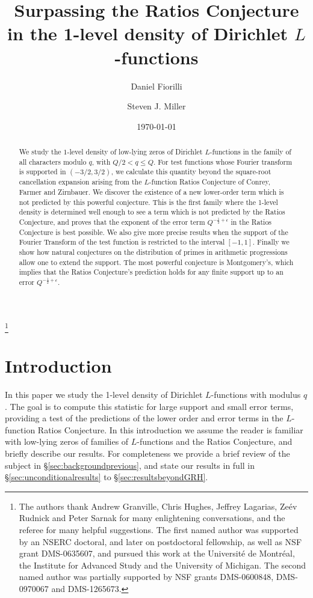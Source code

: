 \documentclass[12pt,reqno]{amsart}
\title{Surpassing the Ratios Conjecture in the 1-level density of Dirichlet $L$-functions}
\author{Daniel Fiorilli}
\author{Steven J. Miller}
\date{\today}
\numberwithin{equation}{section}
\theoremstyle{plain}
\begin{document}
\thanks{The authors thank Andrew Granville, Chris Hughes, Jeffrey Lagarias, Ze\'ev Rudnick and Peter Sarnak for many enlightening conversations, and the referee for many helpful suggestions. The first named author was supported by an NSERC doctoral, and later on postdoctoral fellowship, as well as NSF grant DMS-0635607, and pursued this work at the Universit\'e de Montr\'eal, the Institute for Advanced Study and the University of Michigan. The second named author was partially supported by NSF grants DMS-0600848, DMS-0970067 and DMS-1265673.}

\begin{abstract}
We study the $1$-level density of low-lying zeros of Dirichlet $L$-functions in the family of all characters modulo $q$, with $Q/2 < q\leq Q$. For test functions whose Fourier transform is supported in $(-3/2, 3/2)$, we calculate this quantity beyond the square-root cancellation expansion arising from the $L$-function Ratios Conjecture of Conrey, Farmer and Zirnbauer. We discover the existence of a new lower-order term which is not predicted by this powerful conjecture. This is the first family where the 1-level density is determined well enough to see a term which is not predicted by the Ratios Conjecture, and proves that the exponent of the error term $Q^{-\frac 12 +\epsilon}$ in the Ratios Conjecture is best possible. We also give more precise results when the support of the Fourier Transform of the test function is restricted to the interval $[-1,1]$. Finally we show how natural conjectures on the distribution of primes in arithmetic progressions allow one to extend the support. The most powerful conjecture is Montgomery's, which implies that the Ratios Conjecture's prediction holds for any finite support up to an error $Q^{-\frac 12 +\epsilon}$.

\end{abstract}

\maketitle

\tableofcontents

\section{Introduction}\label{sec:introduction}

In this paper we study the 1-level density of Dirichlet $L$-functions with modulus $q$. The goal is to compute this statistic for large support and small error terms, providing a test of the predictions of the lower order and error terms in the $L$-function Ratios Conjecture. In this introduction we assume the reader is familiar with low-lying zeros of families of $L$-functions and the Ratios Conjecture, and briefly describe our results. For completeness we provide a brief review of the subject in \S\ref{sec:backgroundprevious}, and state our results in full in \S\ref{sec:unconditionalresults} to \S\ref{sec:resultsbeyondGRH}.
\end{document}
